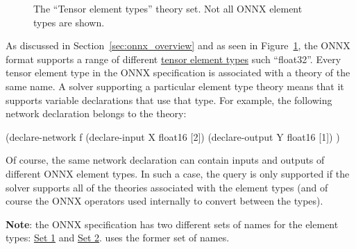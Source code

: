 \begin{figure}[h]
\centering
{}
\caption{The ``Tensor element types'' theory set. Not all ONNX element types are shown.}
\label{fig:element-type-theories}
\end{figure}

As discussed in Section~\ref{sec:onnx_overview} and as seen in Figure~\ref{fig:element-type-theories}, the ONNX format supports a range of different \href{https://onnx.ai/onnx/repo-docs/IR.html#tensor-element-types}{tensor element types} such ``float32''. Every tensor element type in the ONNX specification is associated with a \vnnlib{} theory of the same name. A solver supporting a particular element type theory means that it supports variable declarations that use that type. For example, the following network declaration belongs to the  theory:

\begin{code}[style=lbnf]
(declare-network f
    (declare-input  X float16 [2])
    (declare-output Y float16 [1])
)
\end{code}

Of course, the same network declaration can contain inputs and outputs of different ONNX element types. In such a case, the query is only supported if the solver supports all of the theories associated with the element types (and of course the ONNX operators used internally to convert between the types).

\textbf{Note}: the ONNX specification has two different sets of names for the element types: \href{https://onnx.ai/onnx/repo-docs/IR.html#tensor-element-types}{Set 1} and \href{https://onnx.ai/onnx/intro/concepts.html#element-type}{Set 2}. \vnnlib{} uses the former set of names.

